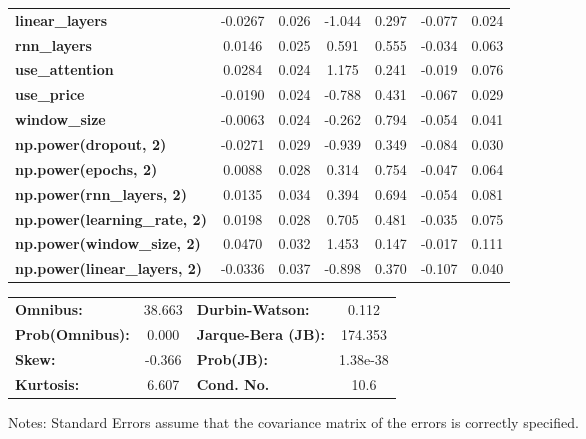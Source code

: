 \begin{center}
\begin{tabular}{lcccccc}
\textbf{linear\_layers}              &      -0.0267  &        0.026     &    -1.044  &         0.297        &       -0.077    &        0.024     \\
\textbf{rnn\_layers}                 &       0.0146  &        0.025     &     0.591  &         0.555        &       -0.034    &        0.063     \\
\textbf{use\_attention}              &       0.0284  &        0.024     &     1.175  &         0.241        &       -0.019    &        0.076     \\
\textbf{use\_price}                  &      -0.0190  &        0.024     &    -0.788  &         0.431        &       -0.067    &        0.029     \\
\textbf{window\_size}                &      -0.0063  &        0.024     &    -0.262  &         0.794        &       -0.054    &        0.041     \\
\textbf{np.power(dropout, 2)}        &      -0.0271  &        0.029     &    -0.939  &         0.349        &       -0.084    &        0.030     \\
\textbf{np.power(epochs, 2)}         &       0.0088  &        0.028     &     0.314  &         0.754        &       -0.047    &        0.064     \\
\textbf{np.power(rnn\_layers, 2)}    &       0.0135  &        0.034     &     0.394  &         0.694        &       -0.054    &        0.081     \\
\textbf{np.power(learning\_rate, 2)} &       0.0198  &        0.028     &     0.705  &         0.481        &       -0.035    &        0.075     \\
\textbf{np.power(window\_size, 2)}   &       0.0470  &        0.032     &     1.453  &         0.147        &       -0.017    &        0.111     \\
\textbf{np.power(linear\_layers, 2)} &      -0.0336  &        0.037     &    -0.898  &         0.370        &       -0.107    &        0.040     \\
\bottomrule
\end{tabular}
\begin{tabular}{lclc}
\textbf{Omnibus:}       & 38.663 & \textbf{  Durbin-Watson:     } &    0.112  \\
\textbf{Prob(Omnibus):} &  0.000 & \textbf{  Jarque-Bera (JB):  } &  174.353  \\
\textbf{Skew:}          & -0.366 & \textbf{  Prob(JB):          } & 1.38e-38  \\
\textbf{Kurtosis:}      &  6.607 & \textbf{  Cond. No.          } &     10.6  \\
\bottomrule
\end{tabular}
\end{center}

Notes: \newline
 [1] Standard Errors assume that the covariance matrix of the errors is correctly specified.